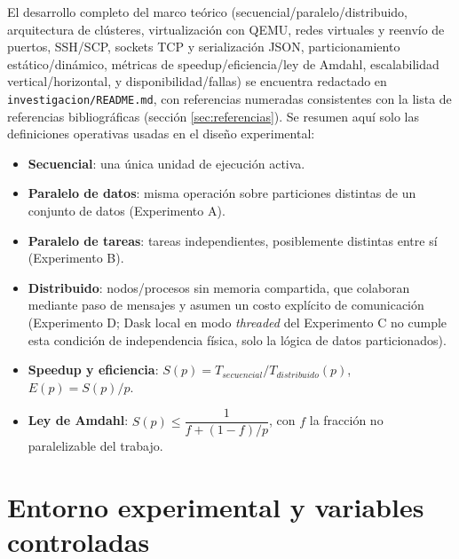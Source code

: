 \documentclass[11pt]{article}
\begin{document}
El desarrollo completo del marco teórico (secuencial/paralelo/distribuido,
arquitectura de clústeres, virtualización con QEMU, redes virtuales y
reenvío de puertos, SSH/SCP, sockets TCP y serialización JSON,
particionamiento estático/dinámico, métricas de speedup/eficiencia/ley de
Amdahl, escalabilidad vertical/horizontal, y disponibilidad/fallas) se
encuentra redactado en \texttt{investigacion/README.md}, con referencias
numeradas consistentes con la lista de referencias bibliográficas (sección
\ref{sec:referencias}). Se resumen aquí solo las definiciones operativas
usadas en el diseño experimental:

\begin{itemize}
  \item \textbf{Secuencial}: una única unidad de ejecución activa.
  \item \textbf{Paralelo de datos}: misma operación sobre particiones distintas de un conjunto de datos (Experimento A).
  \item \textbf{Paralelo de tareas}: tareas independientes, posiblemente distintas entre sí (Experimento B).
  \item \textbf{Distribuido}: nodos/procesos sin memoria compartida, que colaboran mediante paso de mensajes y asumen un costo explícito de comunicación (Experimento D; Dask local en modo \emph{threaded} del Experimento C no cumple esta condición de independencia física, solo la lógica de datos particionados).
  \item \textbf{Speedup y eficiencia}: $S(p) = T_{secuencial}/T_{distribuido}(p)$, $E(p) = S(p)/p$.
  \item \textbf{Ley de Amdahl}: $S(p) \le \dfrac{1}{f + (1-f)/p}$, con $f$ la fracción no paralelizable del trabajo.
\end{itemize}

\section{Entorno experimental y variables controladas}
\end{document}
